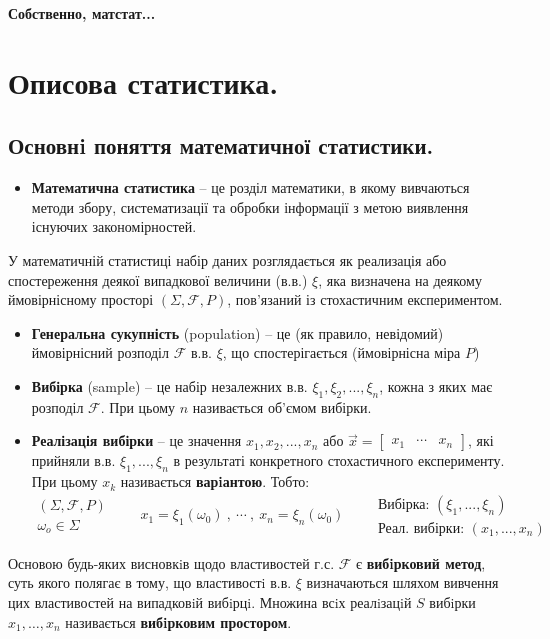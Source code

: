 \def\red#1{\textbf{\color{javared}#1}}
\def\blue#1{\textbf{\color{javadocblue}#1}}
\def\card{\text{card}}
\def\infigral{\int\!\! \cdots\!\! \int}

\begin{center}
	\Huge \textbf{Собственно, матстат...}
\end{center}
\section{Описова статистика.}
\subsection{Основнi поняття математичної статистики.}
 \begin{itemize}
 \item\textbf{\color{javared} Математична статистика} -- це розділ математики, в якому вивчаються методи збору, систематизації та обробки інформації з метою виявлення існуючих закономірностей.
   \end{itemize}
     У математичній статистиці набір даних розглядається як реализація або спостереження деякої випадкової величини (в.в.) $\xi$, яка визначена на деякому ймовірнісному просторі $\left( \Sigma, \mathcal{F}, P \right)$, пов'язаний із стохастичним експериментом.
   \begin{itemize}
     \item \textbf{\color{javared} Генеральна сукупність} (population) --  це (як правило, невідомий) ймовірнісний розподіл $\mathcal{F}$ в.в. $\xi$, що спостерігається (ймовірнісна міра $P$)
     \item \textbf{\color{javared} Вибірка} (sample) -- це набір незалежних в.в. $\xi_1, \xi_2 ,..., \xi_n$, кожна з яких має розподіл $\mathcal{F}$. При цьому $n$ називається об'ємом вибірки.
     \item \textbf{\color{javared} Реалізація вибірки} -- це значення $x_1 , x_2 , ... , x_n$ або $\overrightarrow{x} = \begin{bmatrix}
      x_1 & \cdots & x_n
     \end{bmatrix}$, які прийняли в.в. $\xi_1 , ... , \xi_n$ в результаті конкретного стохастичного експерименту. При цьому $x_k$ називається \textbf{\color{javadocblue} варiантою}. Тобто:
     $$
     \begin{gathered}
      \left( \Sigma , \mathcal{F}, P \right)\\
      \omega_o \in \Sigma
     \end{gathered} \qquad x_1 = \xi_1(\omega_0)\ , \ \cdots \ , \  x_n  = \xi_n (\omega_0) \qquad \begin{array}{r}
      \text{Вибірка: } (\xi_1 , ..., \xi_n) \\
      \text{Реал. вибірки: } (x_1 , ... , x_n)
     \end{array}
     $$
 \end{itemize}
Основою будь-яких висновкiв щодо властивостей г.с. $\mathcal{F}$ є \textbf{\color{javadocblue} вибiрковий метод}, суть якого полягає в тому, що властивостi в.в. $\xi$
визначаються шляхом вивчення цих властивостей
на випадковiй вибiрцi. Множина всiх реалiзацiй $S$ вибiрки $x_1 , \dots , x_n$ називається \textbf{\color{javadocblue} вибiрковим простором}.

